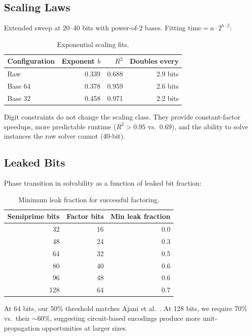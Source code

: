 \documentclass[11pt,a4paper]{article}
\begin{document}
\subsection{Scaling Laws}

Extended sweep at 20--40 bits with power-of-2 bases. Fitting $\text{time} = a \cdot 2^{b \cdot \beta}$:

\begin{table}[h]
\centering
\caption{Exponential scaling fits.}
\label{tab:scaling}
\begin{tabular}{@{}lrrr@{}}
\toprule
Configuration & Exponent $b$ & $R^2$ & Doubles every \\
\midrule
Raw & 0.339 & 0.688 & 2.9 bits \\
Base 64 & 0.378 & 0.959 & 2.6 bits \\
Base 32 & 0.458 & 0.971 & 2.2 bits \\
\bottomrule
\end{tabular}
\end{table}

Digit constraints do not change the scaling class. They provide constant-factor speedups, more predictable runtime ($R^2 > 0.95$ vs.\ $0.69$), and the ability to solve instances the raw solver cannot (40-bit).

\subsection{Leaked Bits}

Phase transition in solvability as a function of leaked bit fraction:

\begin{table}[h]
\centering
\caption{Minimum leak fraction for successful factoring.}
\label{tab:leaked}
\begin{tabular}{@{}rrr@{}}
\toprule
Semiprime bits & Factor bits & Min leak fraction \\
\midrule
32 & 16 & 0.0 \\
48 & 24 & 0.3 \\
64 & 32 & 0.5 \\
80 & 40 & 0.6 \\
96 & 48 & 0.6 \\
128 & 64 & 0.7 \\
\bottomrule
\end{tabular}
\end{table}

At 64 bits, our 50\% threshold matches Ajani et al.~\cite{ajani24}. At 128 bits, we require 70\% vs.\ their ${\sim}60\%$, suggesting circuit-based encodings produce more unit-propagation opportunities at larger sizes.
\end{document}
